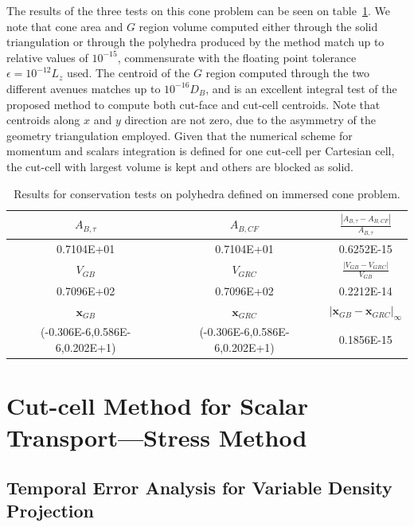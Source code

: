 \documentclass[11pt]{book}
\begin{document}
The results of the three tests on this cone problem can be seen on table~\ref{tab:cone_res}. We note that cone area and $G$ region volume computed either through the solid triangulation or through the polyhedra produced by the method match up to relative values of $10^{-15}$, commensurate with the floating point tolerance $\epsilon=10^{-12}L_z$ used. The centroid of the $G$ region computed through the two different avenues matches up to $10^{-16}D_B$, and is an excellent integral test of the proposed method to compute both cut-face and cut-cell centroids. Note that centroids along $x$ and $y$ direction are not zero, due to the asymmetry of the geometry triangulation employed. Given that the numerical scheme for momentum and scalars integration is defined for one cut-cell per Cartesian cell, the cut-cell with largest volume is kept and others are blocked as solid.
%
\begin{table}[ht]
  \centering
  \begin{tabular}[\textwidth]{c|c|c}
    \hline \hline
      $A_{B,\tau}$ & $A_{B,CF}$ & $\frac{|A_{B,\tau}-A_{B,CF} |}{A_{B,\tau}}$ \\ \hline
       {0.7104E+01} & {0.7104E+01} & {0.6252E-15} \\
    \hline \hline
      $V_{GB}$ & $V_{GRC}$ & $\frac{|V_{GB}-V_{GRC}|}{V_{GB}}$ \\  \hline
      {0.7096E+02} & {0.7096E+02} & {0.2212E-14} \\
    \hline \hline
    $\mathbf{x}_{GB}$ & $\mathbf{x}_{GRC}$ & $|\mathbf{x}_{GB}-\mathbf{x}_{GRC}|_\infty$ \\
    \hline \hline
    {(-0.306E-6,0.586E-6,0.202E+1)} &
    {(-0.306E-6,0.586E-6,0.202E+1)} &
    {0.1856E-15} \\
    \hline
  \end{tabular}
  \caption[Conservation tests for polyhedra]{Results for conservation tests on polyhedra defined on immersed cone problem.}
  \label{tab:cone_res}
\end{table}
%


\section{Cut-cell Method for Scalar Transport---Stress Method}

\subsection{Temporal Error Analysis for Variable Density Projection}
\end{document}
